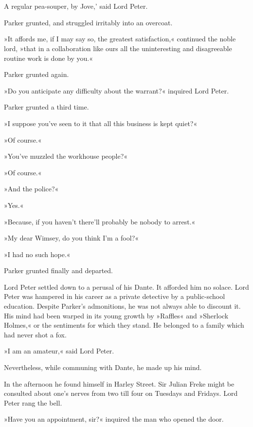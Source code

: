 \chapter[Chapter \thechapter]{}
\lettrine[lines=4,ante=‘]{A}{} regular pea-souper, by Jove,' said Lord Peter.

\zz
Parker grunted, and struggled irritably into an overcoat.

\zz
»It affords me, if I may say so, the greatest satisfaction,« continued the noble lord, »that in a collaboration like ours all the uninteresting and disagreeable routine work is done by you.«

Parker grunted again.

»Do you anticipate any difficulty about the warrant?« inquired Lord Peter.

Parker grunted a third time.

»I suppose you've seen to it that all this business is kept quiet?«

»Of course.«

»You've muzzled the workhouse people?«

»Of course.«

»And the police?«

»Yes.«

»Because, if you haven't there'll probably be nobody to arrest.«

»My dear Wimsey, do you think I'm a fool?«

»I had no such hope.«

Parker grunted finally and departed.

Lord Peter settled down to a perusal of his Dante. It afforded him no solace. Lord Peter was hampered in his career as a private detective by a public-school education. Despite Parker's admonitions, he was not always able to discount it. His mind had been warped in its young growth by »Raffles« and »Sherlock Holmes,« or the sentiments for which they stand. He belonged to a family which had never shot a fox.

»I am an amateur,« said Lord Peter.

Nevertheless, while communing with Dante, he made up his mind.

In the afternoon he found himself in Harley Street. Sir Julian Freke might be consulted about one's nerves from two till four on Tuesdays and Fridays. Lord Peter rang the bell.

»Have you an appointment, sir?« inquired the man who opened the door.

